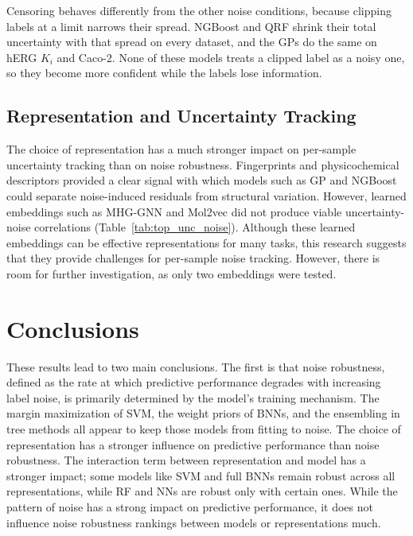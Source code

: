Censoring behaves differently from the other noise conditions, because clipping labels at a limit narrows their spread. NGBoost and QRF shrink their total uncertainty with that spread on every dataset, and the GPs do the same on hERG $K_i$ and Caco-2. None of these models treats a clipped label as a noisy one, so they become more confident while the labels lose information.


\subsection{Representation and Uncertainty Tracking}

The choice of representation has a much stronger impact on per-sample uncertainty tracking than on noise robustness. Fingerprints and physicochemical descriptors provided a clear signal with which models such as GP and NGBoost could separate noise-induced residuals from structural variation. However, learned embeddings such as MHG-GNN and Mol2vec did not produce viable uncertainty-noise correlations (Table~\ref{tab:top_unc_noise}). Although these learned embeddings can be effective representations for many tasks, this research suggests that they provide challenges for per-sample noise tracking. However, there is room for further investigation, as only two embeddings were tested.

\section{Conclusions}

These results lead to two main conclusions. The first is that noise robustness, defined as the rate at which predictive performance degrades with increasing label noise, is primarily determined by the model's training mechanism. The margin maximization of SVM, the weight priors of BNNs, and the ensembling in tree methods all appear to keep those models from fitting to noise. The choice of representation has a stronger influence on predictive performance than noise robustness. The interaction term between representation and model has a stronger impact; some models like SVM and full BNNs remain robust across all representations, while RF and NNs are robust only with certain ones. While the pattern of noise has a strong impact on predictive performance, it does not influence noise robustness rankings between models or representations much.

